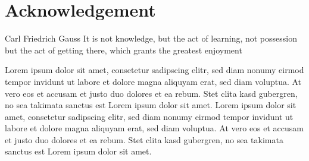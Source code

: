 \chapter*{Acknowledgement}
\begin{chapquote}{Carl Friedrich Gauss}
It is not knowledge, but the act of learning, not possession but the act of getting there, which grants the greatest enjoyment
\end{chapquote}

\noindent Lorem ipsum dolor sit amet, consetetur sadipscing elitr, sed diam nonumy eirmod tempor invidunt ut labore et dolore magna aliquyam erat, sed diam voluptua. At vero eos et accusam et justo duo dolores et ea rebum. Stet clita kasd gubergren, no sea takimata sanctus est Lorem ipsum dolor sit amet. Lorem ipsum dolor sit amet, consetetur sadipscing elitr, sed diam nonumy eirmod tempor invidunt ut labore et dolore magna aliquyam erat, sed diam voluptua. At vero eos et accusam et justo duo dolores et ea rebum. Stet clita kasd gubergren, no sea takimata sanctus est Lorem ipsum dolor sit amet.